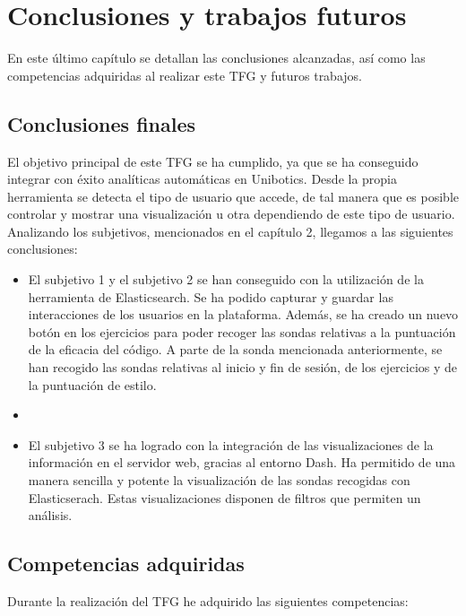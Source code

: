 \chapter{Conclusiones y trabajos futuros}\label{conclusión}

	En este último capítulo se detallan las conclusiones alcanzadas, así como las competencias adquiridas al realizar este TFG y futuros trabajos.
	
	\section{Conclusiones finales} 
	\label{sec:conclusiones_finales} 
El objetivo principal de este TFG se ha cumplido, ya que se ha conseguido integrar con éxito analíticas automáticas en Unibotics. Desde la propia herramienta se detecta el tipo de usuario que accede, de tal manera que es posible controlar y mostrar una visualización u otra dependiendo de este tipo de usuario. Analizando los subjetivos, mencionados en el capítulo 2, llegamos a las siguientes conclusiones:\\

\begin{itemize}
\item  El subjetivo 1 y el subjetivo 2 se han conseguido con la utilización de la herramienta de Elasticsearch. Se ha podido capturar y guardar las interacciones de los usuarios en la plataforma. Además, se ha creado un nuevo botón en los ejercicios para poder recoger las sondas relativas a la puntuación de la eficacia del código. A parte de la sonda mencionada anteriormente, se han recogido las sondas relativas al inicio y fin de sesión, de los ejercicios y de la puntuación de estilo.
\item \newpage
\item El subjetivo 3 se ha logrado con la integración de las visualizaciones de la información en el servidor web, gracias al entorno Dash. Ha permitido de una manera sencilla y potente la visualización de las sondas recogidas con Elasticserach. Estas visualizaciones disponen de filtros que permiten un análisis.
\end{itemize}

	\section{Competencias adquiridas} 
	\label{sec:competencias_adquiridas} 
	Durante la realización del TFG he adquirido las siguientes competencias:
		
